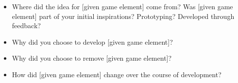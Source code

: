 \documentclass[]{article}
\begin{document}
\begin{itemize}
\item Where did the idea for [given game element] come from? Was [given game element] part of your initial inspirations? Prototyping? Developed through feedback?
\item Why did you choose to develop [given game element]?
\item Why did you choose to remove [given game element]?
\item How did [given game element] change over the course of development?
\end{itemize}






%
%
%
\end{document}
